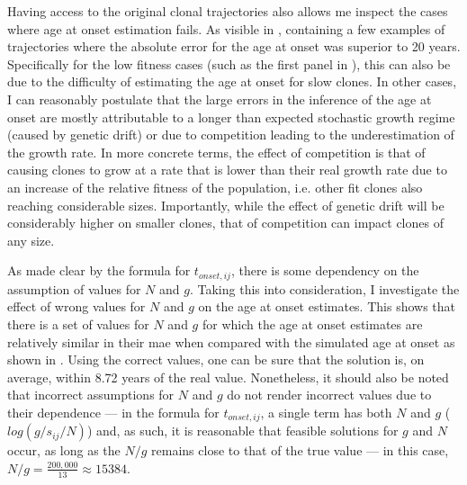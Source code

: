 \begin{figure}[!ht]
	\label{fig:age-at-onset-vs-true-fitness-sim}
\end{figure}

Having access to the original clonal trajectories also allows me inspect the cases where age at onset estimation fails. As visible in , containing a few examples of trajectories where the absolute error for the age at onset was superior to 20 years. Specifically for the low fitness cases (such as the first panel in ), this can also be due to the difficulty of estimating the age at onset for slow clones. In other cases, I can reasonably postulate that the large errors in the inference of the age at onset are mostly attributable to a longer than expected stochastic growth regime (caused by genetic drift) or due to competition leading to the underestimation of the growth rate. In more concrete terms, the effect of competition is that of causing clones to grow at a rate that is lower than their real growth rate due to an increase of the relative fitness of the population, i.e. other fit clones also reaching considerable sizes. Importantly, while the effect of genetic drift will be considerably higher on smaller clones, that of competition can impact clones of any size.

\begin{figure}[!ht]
	\label{fig:examples-bad-inference}
\end{figure}

As made clear by the formula for $t_{onset,ij}$, there is some dependency on the assumption of values for $N$ and $g$. Taking this into consideration, I investigate the effect of wrong values for $N$ and $g$ on the age at onset estimates. This shows that there is a set of values for $N$ and $g$ for which the age at onset estimates are relatively similar in their \ac{mae} when compared with the simulated age at onset as shown in . Using the correct values, one can be sure that the solution is, on average, within 8.72 years of the real value. Nonetheless, it should also be noted that incorrect assumptions for $N$ and $g$ do not render incorrect values due to their dependence --- in the formula for $t_{onset,ij}$, a single term has both $N$ and $g$ ($log(g/s_{ij}/N)$) and, as such, it is reasonable that feasible solutions for $g$ and $N$ occur, as long as the $N/g$ remains close to that of the true value --- in this case, $N/g = \frac{200,000}{13} \approx 15384$.

